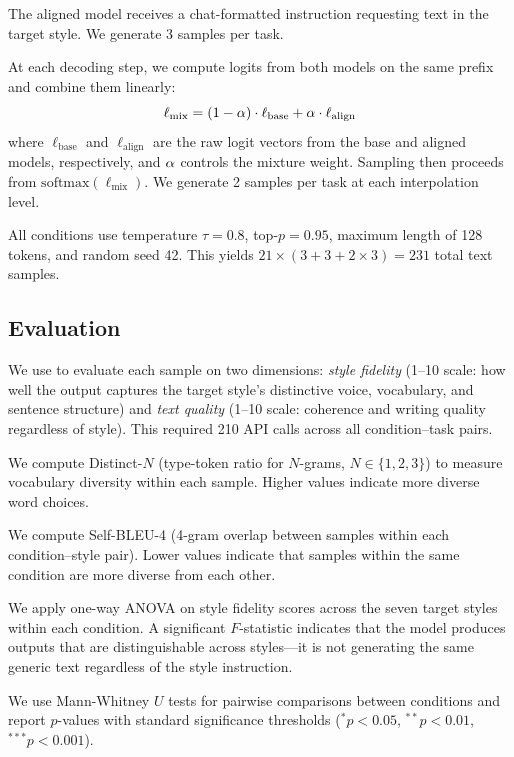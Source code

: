The aligned model receives a chat-formatted instruction requesting text in the
target style. We generate 3 samples per task.

At each decoding step, we compute logits from both models on the same prefix and
combine them linearly:
\begin{equation}
    \ell_{\text{mix}} = (1 - \alpha) \cdot \ell_{\text{base}} + \alpha \cdot \ell_{\text{align}}
    \label{eq:interp}
\end{equation}
where $\ell_{\text{base}}$ and $\ell_{\text{align}}$ are the raw logit vectors
from the base and aligned models, respectively, and $\alpha$ controls the
mixture weight. Sampling then proceeds from $\text{softmax}(\ell_{\text{mix}})$.
We generate 2 samples per task at each interpolation level.

All conditions use temperature $\tau = 0.8$, top-$p = 0.95$, maximum length of
128 tokens, and random seed 42. This yields $21 \times (3 + 3 + 2 \times 3) = 231$
total text samples.

\subsection{Evaluation}
\label{sec:eval}

We use \gptjudge to evaluate each sample on two dimensions: \emph{style fidelity}
(1--10 scale: how well the output captures the target style's distinctive voice,
vocabulary, and sentence structure) and \emph{text quality} (1--10 scale: coherence
and writing quality regardless of style). This required 210 API calls across all
condition--task pairs.

We compute Distinct-$N$ (type-token ratio for $N$-grams, $N \in \{1,2,3\}$) to
measure vocabulary diversity within each sample. Higher values indicate more
diverse word choices.

We compute Self-BLEU-4 (4-gram overlap between samples within each condition--style
pair). Lower values indicate that samples within the same condition are more
diverse from each other.

We apply one-way ANOVA on style fidelity scores across the seven target styles
within each condition. A significant $F$-statistic indicates that the model
produces outputs that are distinguishable across styles---\ie it is not generating
the same generic text regardless of the style instruction.

We use Mann-Whitney $U$ tests for pairwise comparisons between conditions and
report $p$-values with standard significance thresholds ($^{*}p < 0.05$,
$^{**}p < 0.01$, $^{***}p < 0.001$).
